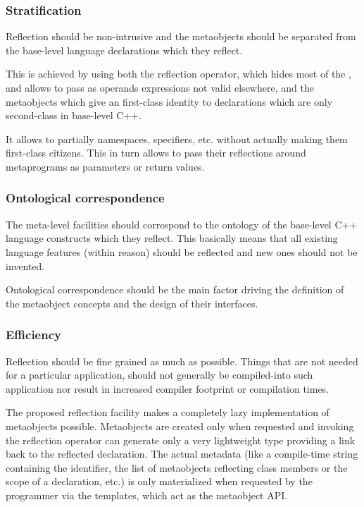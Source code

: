 \subsubsection{Stratification}
\label{design-stratification}

Reflection should be non-intrusive and the metaobjects should be separated
from the base-level language declarations which they reflect.

This is achieved by using both the reflection operator, which hides most of the
, and allows to pass as operands expressions not valid elsewhere,
and the metaobjects which give an first-class identity to declarations
which are only second-class in base-level C++.

It allows to partially  namespaces, specifiers, etc. without actually
making them first-class citizens. This in turn allows to pass their reflections around
metaprograms as parameters or return values.

\subsubsection{Ontological correspondence}
\label{design-onto-corr}

The meta-level facilities should
correspond to the ontology of the base-level C++ language constructs
which they reflect. This basically means that all existing language
features (within reason) should be reflected and new ones should not be invented.

Ontological correspondence should be the main factor driving the definition of the
metaobject concepts and the design of their interfaces.


\subsubsection{Efficiency}
\label{design-efficiency}

Reflection should be fine grained as much as possible.
Things that are not needed for a particular application,
should not generally be compiled-into such application nor result in
increased compiler footprint or compilation times.

The proposed reflection facility makes a completely lazy implementation of
metaobjects possible. Metaobjects are created only when requested and invoking
the reflection operator can generate only a very
lightweight type providing a link back to the reflected declaration. The actual
metadata (like a compile-time string containing the identifier,
the list of metaobjects reflecting class members or the scope of a declaration, etc.)
is only materialized when requested by the programmer via the
templates, which act as the metaobject API.

